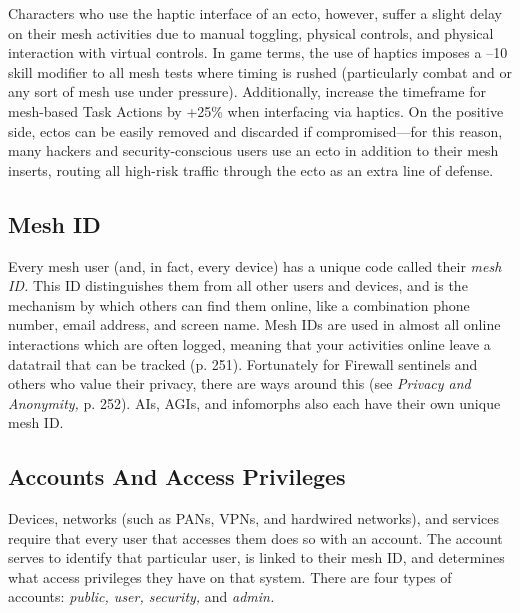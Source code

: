 Characters who use the haptic interface of an ecto, 
however, suffer a slight delay on their mesh activities 
due to manual toggling, physical controls, and physical
interaction with virtual controls. In game terms,
the use of haptics imposes a –10 skill modifier  to 
all mesh tests where timing is rushed (particularly 
combat and or any sort of mesh use under pressure). 
Additionally, increase the timeframe for mesh-based 
Task Actions by +25\% when interfacing via haptics. 
On the positive side, ectos can be easily removed and 
discarded if compromised—for this reason, many 
hackers and security-conscious users use an ecto in 
addition to their mesh inserts, routing all high-risk 
traffic through the ecto as an extra line of defense.

\subsection{Mesh ID}

Every mesh user (and, in fact, every device) has a 
unique code called their \textit{mesh ID.} This ID distinguishes
them from all other users and devices, and is
the mechanism by which others can find them online, 
like a combination phone number, email address, and 
screen name. Mesh IDs are used in almost all online interactions
which are often logged, meaning that your
activities online leave a datatrail that can be tracked 
(p. 251). Fortunately for Firewall sentinels and others 
who value their privacy, there are ways around this 
(see \textit{Privacy and Anonymity,} p. 252). AIs, AGIs, and 
infomorphs also each have their own unique mesh ID.

\subsection{Accounts And Access Privileges}

Devices, networks (such as PANs, VPNs, and hardwired
networks), and services require that every user
that accesses them does so with an account. The 
account serves to identify that particular user, is 
linked to their mesh ID, and determines what access 
privileges they have on that system. There are four 
types of accounts: \textit{public, user, security,} and \textit{admin.}

